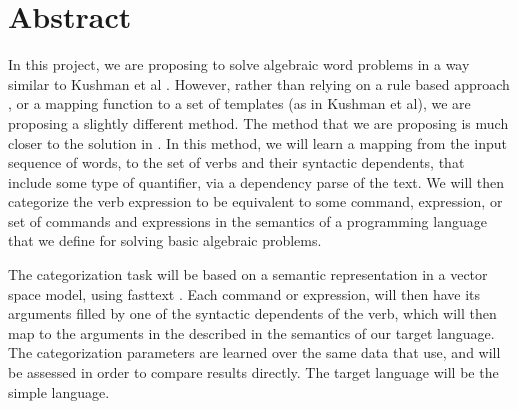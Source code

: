 \section{Abstract}
In this project, we are proposing to solve algebraic word problems in a way similar to Kushman et al \citep{kushman2014}. However, rather than relying on a rule based approach \citep{MukherjeeandGarain}, or a mapping function to a set of templates (as in Kushman et al), we are proposing a slightly different method. The method that we are proposing is much closer to the solution in \citep{Hosseini2014}. In this method, we will learn a mapping from the input sequence of words, to the set of verbs and their syntactic dependents, that include some type of quantifier, via a dependency parse of the text. We will then categorize the verb expression to be equivalent to some command, expression, or set of commands and expressions in the semantics of a programming language that we define for solving basic algebraic problems. 

The categorization task will be based on a semantic representation in a vector space model, using fasttext \citep{bojanowski2016enriching}. Each command or expression, will then have its arguments filled by one of the syntactic dependents of the verb, which will then map to the arguments in the described in the semantics of our target language. The categorization parameters are learned over the same data that \citep{Hosseini2014} use, and will be assessed in order to compare results directly. The target language will be the simple \IMP language.